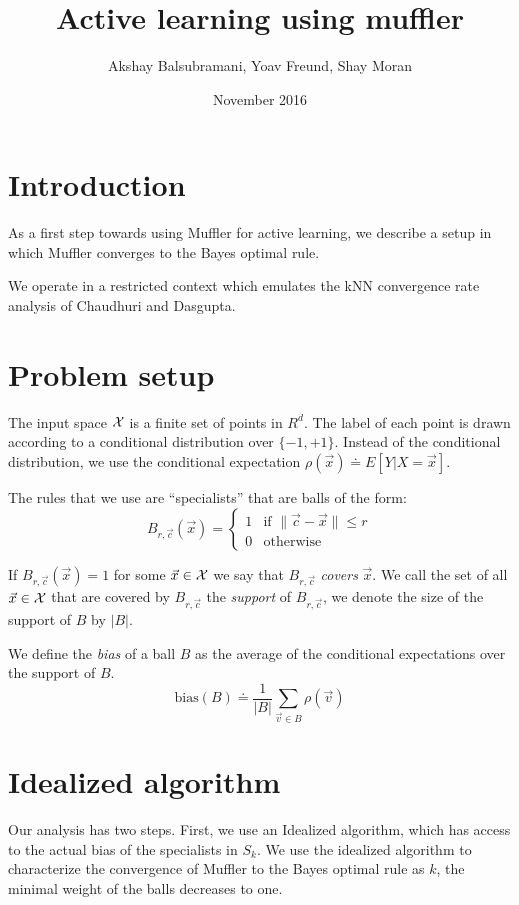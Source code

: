 \documentclass{article}
\title{Active learning using muffler}
\author{Akshay Balsubramani, Yoav Freund, Shay Moran}
\date{November 2016}
\newcommand{\X}{{\cal X}}
\newcommand{\x}{\vec{x}}
\newcommand{\vv}{\vec{v}}
\newcommand{\cc}{\vec{c}}
\newcommand{\bias}{\text{bias}}
\begin{document}
\maketitle

\section{Introduction}

As a first step towards using Muffler for active learning, we describe
a setup in which Muffler converges to the Bayes optimal rule.

We operate in a restricted context which emulates the kNN 
convergence rate analysis of Chaudhuri and Dasgupta.

\section{Problem setup}

The input space $\X$ is a finite set of points in $R^d$.
The label of each point is drawn according to a conditional
distribution over $\{-1,+1\}$. Instead of the conditional
distribution, we use the conditional expectation
$\rho(\x) \doteq E[Y | X=\x]$.

The rules that we use are ``specialists'' that are balls of the form:
\[
B_{r,\cc}(\x) =
\begin{cases}
 1 & \text{if } \| \cc- \x \| \leq r \\
 0 & \text{otherwise }
\end{cases}
\]

If $B_{r,\cc}(\x) =1$ for some $\x \in \X$ we say that $B_{r,\cc}$
{\em covers} $\x$. We call the set of all $\x \in \X$ that are covered
by $B_{r,\cc}$ the {\em support} of $B_{r,\cc}$, we denote the size of
the support of $B$ by $|B|$.

We define the {\em bias} of a ball $B$ as the average of the
conditional expectations over the support of $B$.
$$
\bias(B) \doteq \frac{1}{|B|} \sum_{\vv \in B} \rho(\vv)
$$

\section{Idealized algorithm}

Our analysis has two steps. First, we use an Idealized algorithm,
which has access to the actual bias of the specialists in $S_k$. We
use the idealized algorithm to characterize the convergence of
Muffler to the Bayes optimal rule as $k$, the minimal weight of the balls
decreases to one.
\end{document}
